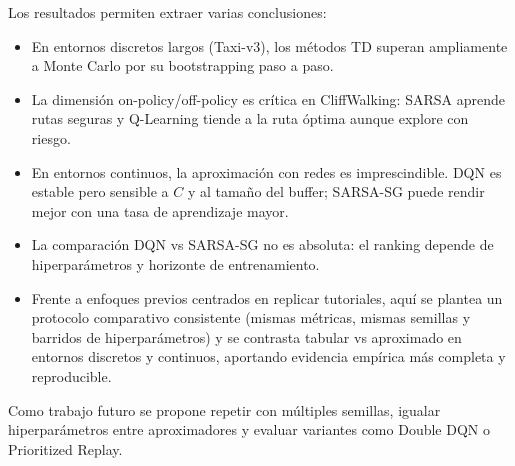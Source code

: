 Los resultados permiten extraer varias conclusiones:
\begin{itemize}
    \item En entornos discretos largos (Taxi-v3), los métodos TD superan ampliamente a Monte Carlo por su bootstrapping paso a paso.
    \item La dimensión on-policy/off-policy es crítica en CliffWalking: SARSA aprende rutas seguras y Q-Learning tiende a la ruta óptima aunque explore con riesgo.
    \item En entornos continuos, la aproximación con redes es imprescindible. DQN es estable pero sensible a $C$ y al tamaño del buffer; SARSA-SG puede rendir mejor con una tasa de aprendizaje mayor.
    \item La comparación DQN vs SARSA-SG no es absoluta: el ranking depende de hiperparámetros y horizonte de entrenamiento.
    \item Frente a enfoques previos centrados en replicar tutoriales, aquí se plantea un protocolo comparativo consistente (mismas métricas, mismas semillas y barridos de hiperparámetros) y se contrasta tabular vs aproximado en entornos discretos y continuos, aportando evidencia empírica más completa y reproducible.
\end{itemize}

Como trabajo futuro se propone repetir con múltiples semillas, igualar hiperparámetros entre aproximadores y evaluar variantes como Double DQN o Prioritized Replay.
